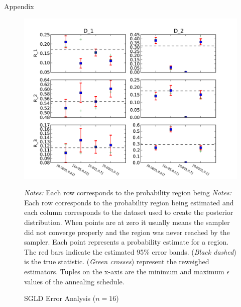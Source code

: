 \documentclass{article}
\begin{document}
\begin{section}{Appendix}
\begin{figure}
\caption{SGLD Error Analysis ($n=16$)}
\label{n16}
\begin{center}
\includegraphics[scale=0.7]{../figures/errors_n16.pdf}
\end{center}
{\scriptsize {\em Notes:} Each row corresponds to the probability region being {\em Notes:} Each row corresponds to the probability region being estimated and each column corresponds to the dataset used to create the posterior distribution. When points are at zero it usually means the sampler did not converge properly and the region was never reached by the sampler.  Each point represents a probability estimate for a region. The red bars indicate the estimated 95\% error bands.  ({\em Black dashed}) is the true statistic.  ({\em Green crosses}) represent the reweighed estimators. Tuples on the x-axis are the minimum and maximum $\epsilon$ values of the annealing schedule. }
\end{figure}
\end{section}
\end{document}
